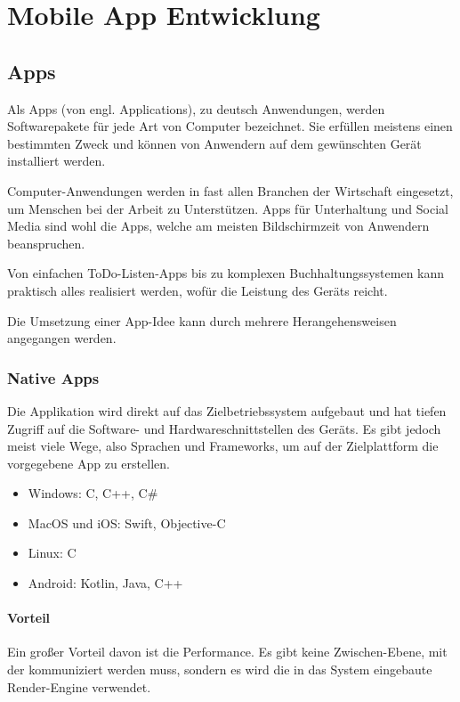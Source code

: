 \chapter{Mobile App Entwicklung}
\label{mobiledev}

\section{Apps}
Als Apps (von engl. Applications), zu deutsch Anwendungen, werden Softwarepakete für jede Art von
Computer bezeichnet. Sie erfüllen meistens einen bestimmten Zweck und können von Anwendern auf dem
gewünschten Gerät installiert werden.

Computer-Anwendungen werden in fast allen Branchen der Wirtschaft eingesetzt, um Menschen bei der
Arbeit zu Unterstützen. Apps für Unterhaltung und Social Media sind wohl die Apps, welche am meisten
Bildschirmzeit von Anwendern beanspruchen.

Von einfachen ToDo-Listen-Apps bis zu komplexen Buchhaltungssystemen kann praktisch alles realisiert
werden, wofür die Leistung des Geräts reicht.

Die Umsetzung einer App-Idee kann durch mehrere Herangehensweisen angegangen werden.

\subsection{Native Apps}
Die Applikation wird direkt auf das Zielbetriebssystem aufgebaut und hat tiefen Zugriff auf die
Software- und Hardwareschnittstellen des Geräts. Es gibt jedoch meist viele Wege, also Sprachen und
Frameworks, um auf der Zielplattform die vorgegebene App zu erstellen.

\begin{itemize}
  \item Windows: C, C++, C\#
  \item MacOS und iOS: Swift, Objective-C
  \item Linux: C
  \item Android: Kotlin, Java, C++
\end{itemize}

\subsubsection{Vorteil}
Ein großer Vorteil davon ist die Performance. Es gibt keine Zwischen-Ebene, mit der kommuniziert
werden muss, sondern es wird die in das System eingebaute Render-Engine verwendet.

